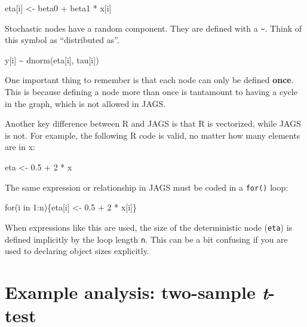 \documentclass[
  13,
  letterpaper,
]{report}
\newenvironment{Shaded}{\begin{snugshade}}{\end{snugshade}}
\newcommand{\NormalTok}[1]{\textcolor[rgb]{0.00,0.23,0.31}{#1}}
\begin{document}
\begin{Shaded}
\begin{Highlighting}[]
\NormalTok{eta[i] \textless{}{-} beta0 + beta1 * x[i]}
\end{Highlighting}
\end{Shaded}

Stochastic nodes have a random component. They are defined with a
\texttt{\textasciitilde{}}. Think of this symbol as ``distributed as''.

\begin{Shaded}
\begin{Highlighting}[]
\NormalTok{y[i] \textasciitilde{} dnorm(eta[i], tau[i])}
\end{Highlighting}
\end{Shaded}

One important thing to remember is that each node can only be defined
\textbf{once}. This is because defining a node more than once is
tantamount to having a cycle in the graph, which is not allowed in JAGS.

Another key difference between R and JAGS is that R is vectorized, while
JAGS is not. For example, the following R code is valid, no matter how
many elements are in x:

\begin{Shaded}
\begin{Highlighting}[]
\NormalTok{eta \textless{}{-} 0.5 + 2 * x}
\end{Highlighting}
\end{Shaded}

The same expression or relationship in JAGS must be coded in a
\texttt{for()} loop:

\begin{Shaded}
\begin{Highlighting}[]
\NormalTok{for(i in 1:n)\{eta[i] \textless{}{-} 0.5 + 2 * x[i]\}}
\end{Highlighting}
\end{Shaded}

When expressions like this are used, the size of the deterministic node
(\texttt{eta}) is defined implicitly by the loop length \texttt{n}. This
can be a bit confusing if you are used to declaring object sizes
explicitly.

\section{\texorpdfstring{Example analysis: two-sample
\emph{t}-test}{Example analysis: two-sample t-test}}\label{example-analysis-two-sample-t-test}
\end{document}
